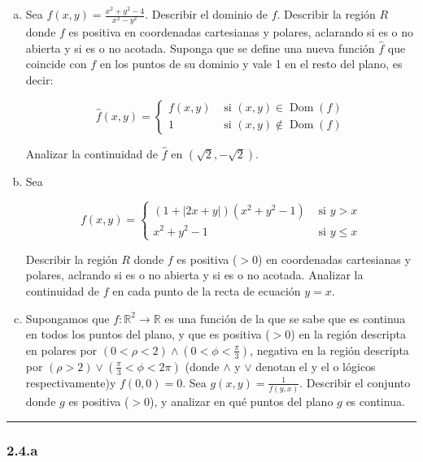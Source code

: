 \documentclass{article}
\renewcommand{\Bbb}{\mathbb}
\begin{document}
\begin{enumerate}[(a)]
\bfseries
\item Sea $f(x,y) = \frac{x^2 + y^2 -4}{x^2 - y^2}$. Describir el dominio de $f$. Describir la región $R$ donde $f$ es positiva en coordenadas cartesianas y polares, aclarando si es o no abierta y si es o no acotada. Suponga que se define una nueva función $\hat{f}$ que coincide con $f$ en los puntos de su dominio y vale 1 en el resto del plano, es decir:

\begin{equation}
\hat{f}(x,y) = \left\{ \begin{array}{ll}
f(x,y) &\text{ si } (x,y) \in \mathop{Dom}(f) \\
1 & \text{ si } (x,y) \notin \mathop{Dom}(f)
\end{array}
\right.
\end{equation}

Analizar la continuidad de $\hat{f}$ en $(\sqrt{2}, -\sqrt{2})$.

\item Sea

\begin{equation}
f(x,y) = \left\{ \begin{array}{ll}
(1 + |2x+y|) (x^2 + y^2 -1) &\text{ si } y > x \\
x^2 + y^2 - 1 & \text{ si } y \leq x
\end{array}
\right.
\end{equation}

Describir la región $R$ donde $f$ es positiva ($> 0$) en coordenadas cartesianas y polares, aclrando si es o no abierta y si es o no acotada. Analizar la continuidad de $f$ en cada punto de la recta de ecuación $y = x$.

\item Supongamos que $f: \Bbb R^2 \rightarrow \Bbb R$ es una función de la que se sabe que es continua en todos los puntos del plano, y que es positiva ($> 0$) en la región descripta en polares por $(0 < \rho < 2) \wedge (0 < \phi < \frac{\pi}{3})$, negativa en la región descripta por $(\rho > 2) \vee (\frac{\pi}{3} < \phi < 2\pi)$ (donde $\wedge$ y $\vee$ denotan el y el o lógicos respectivamente)y $f(0,0) = 0$. Sea $g(x,y) = \frac{1}{f(y,x)}$. Describir el conjunto donde $g$ es positiva ($>0$), y analizar en qué puntos del plano $g$ es continua.

\end{enumerate}
\hrule

\subsubsection*{2.4.a}
\label{subsubsec:2.4.a}
\end{document}

